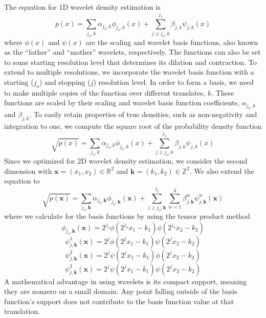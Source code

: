 \documentclass[../tech_report_1.tex]{subfiles}
\begin{document}
The equation for 1D wavelet density estimation is 
\begin{equation}
p(x)=\underset{j_{o},k}{\sum}\alpha_{j_{o},k}\phi_{j_{o},k}(x)+\underset{j\geq j_{o},k}{\overset{j_{1}}{\sum}}\beta_{j,k}\psi_{j,k}(x)\label{eq:WDE}
\end{equation}
where $\phi(x)$ and $\psi(x)$ are the scaling and wavelet basis
functions, also known as the ``father'' and ``mother'' wavelets,
respectively. The functions can also be set to some starting resolution
level that determines its dilation and contraction. To extend to multiple
resolutions, we incorporate the wavelet basis function with a starting ($j_{o}$) and stopping ($j$) resolution level. In order to form a
basis, we need to make multiple copies of the function over different
translates, $k$. These functions are scaled by their scaling and
wavelet basis function coefficients, $\alpha_{j_{o},k}$ and $\beta_{j,k}$.
To easily retain properties of true densities, such as non-negativity and
integration to one, we compute the square root of the probability
density function 
\begin{equation}
\sqrt{p(x)}=\underset{j_{o},k}{\sum}\alpha_{j_{o},k}\phi_{j_{o},k}(x)+\underset{j\geq j_{o},k}{\overset{j_{1}}{\sum}}\beta_{j,k}\psi_{j,k}(x)\label{eq:sqrtWDE}
\end{equation}
Since we optimized for 2D wavelet density estimation,
we consider the second dimension with $\mathbf{x}=(x_{1},x_{2})\in\mathbb{R}^{2}$
and \textbf{$\mathbf{k}=(k_{1},k_{2})\in\mathbb{Z}^{2}$}. We also
extend the equation to 
\begin{equation}
\sqrt{p(\mathbf{x})}=\underset{j_{o},\mathbf{k}}{\sum}\alpha_{j_{o},\mathbf{k}}\phi_{j_{o},\mathbf{k}}(\mathbf{x})+\underset{j\geq j_{o},\mathbf{k}}{\overset{j_{1}}{\sum}}\overset{3}{\underset{w=1}{\sum}}\beta_{j,\mathbf{k}}^{w}\psi_{j,\mathbf{k}}^{w}(\mathbf{x})\label{eq:sqrtWDE2Dmultires}
\end{equation}
where we calculate for the basis functions by using the tensor product
method 
\[
\phi_{j_{o},\mathbf{k}}(\mathbf{x})=2^{j_{o}}\phi(2^{j_{o}}x_{1}-k_{1})\phi(2^{j_{o}}x_{2}-k_{2})
\]
\[
\psi_{j,\mathbf{k}}^{1}(\mathbf{x})=2^{j}\phi(2^{j}x_{1}-k_{1})\psi(2^{j}x_{2}-k_{2})
\]
\[
\psi_{j,\mathbf{k}}^{2}(\mathbf{x})=2^{j}\psi(2^{j}x_{1}-k_{1})\phi(2^{j}x_{2}-k_{2})
\]
\begin{equation}
\psi_{j,\mathbf{k}}^{3}(\mathbf{x})=2^{j}\psi(2^{j}x_{1}-k_{1})\psi(2^{j}x_{2}-k_{2})\label{eq:multiRes2D}
\end{equation}
A mathematical advantage in using wavelets is its compact support,
meaning they are nonzero on a small domain. Any point falling outside
of the basis function's support does not contribute to the basis function
value at that translation.
\end{document}
